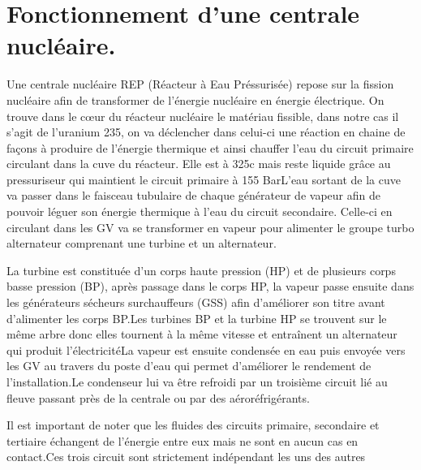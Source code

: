 \section{Fonctionnement d'une centrale nucléaire.}

Une centrale nucléaire REP (Réacteur à Eau Préssurisée) repose sur la fission nucléaire afin de transformer de l’énergie nucléaire en énergie électrique. On trouve dans le cœur du réacteur nucléaire le matériau fissible, dans notre cas il s’agit de l’uranium 235,  on  va  déclencher  dans  celui-ci une réaction en chaine de façons à produire de l’énergie thermique et ainsi chauffer l’eau du circuit primaire circulant dans la cuve du réacteur. Elle est à 325c   mais   reste   liquide   grâce   au   pressuriseur   qui   maintient   le   circuit   primaire   à   155   BarL’eau sortant de la cuve va passer dans le faisceau tubulaire de chaque générateur de vapeur afin de pouvoir léguer son énergie thermique à l’eau du circuit secondaire. Celle-ci en circulant  dans les GV va se transformer en vapeur pour alimenter le groupe turbo alternateur comprenant une turbine et un alternateur.

La  turbine  est  constituée  d'un  corps  haute  pression  (HP)  et  de  plusieurs  corps  basse  pression  (BP), après passage dans le corps HP, la  vapeur passe ensuite dans les générateurs sécheurs surchauffeurs (GSS) afin d’améliorer son titre avant d'alimenter les corps BP.Les turbines BP et la turbine HP se trouvent sur le même arbre donc elles tournent à la même vitesse et entraînent un alternateur qui produit l'électricitéLa  vapeur  est  ensuite  condensée  en  eau  puis  envoyée  vers  les  GV  au  travers  du  poste  d'eau  qui permet d'améliorer le rendement de l'installation.Le condenseur lui va être refroidi par un troisième circuit lié au fleuve passant près de la centrale ou par des aéroréfrigérants.

Il  est  important  de  noter  que  les  fluides  des  circuits  primaire,  secondaire  et  tertiaire  échangent  de l’énergie entre eux mais ne sont en aucun cas en contact.Ces trois circuit sont strictement indépendant les uns des autres
~\cite[IRSN]{IRSN_rep_schema}

